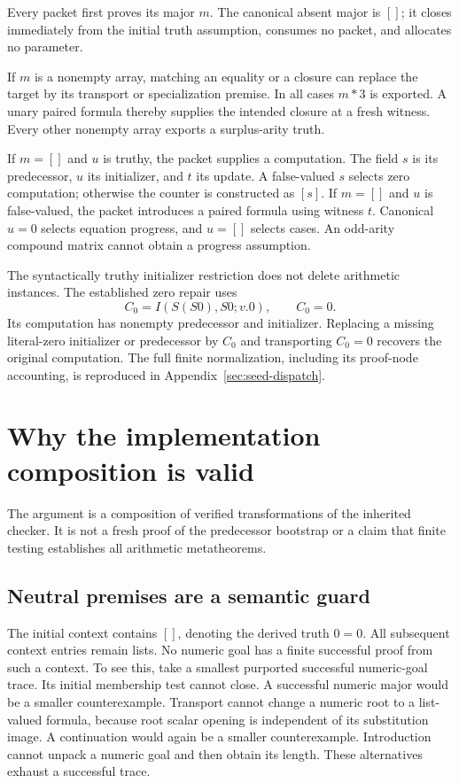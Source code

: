 \documentclass[11pt,letterpaper]{article}
\theoremstyle{definition}\newtheorem{definition}[theorem]{Definition}
\theoremstyle{remark}\newtheorem{remark}[theorem]{Remark}
\begin{document}
Every packet first proves its major $m$. The canonical absent major is $[]$;
it closes immediately from the initial truth assumption, consumes no packet,
and allocates no parameter.

If $m$ is a nonempty array, matching an equality or a closure can replace
the target by its transport or specialization premise. In all cases $m*3$
is exported. A unary paired formula thereby supplies the intended closure
at a fresh witness. Every other nonempty array exports a surplus-arity truth.

If $m=[]$ and $u$ is truthy, the packet supplies a computation. The field $s$
is its predecessor, $u$ its initializer, and $t$ its update. A false-valued $s$
selects zero computation; otherwise the counter is constructed as $[s]$.
If $m=[]$ and $u$ is false-valued, the packet introduces a paired formula
using witness $t$. Canonical $u=0$ selects equation progress, and $u=[]$
selects cases. An odd-arity compound matrix cannot obtain a progress assumption.

The syntactically truthy initializer restriction does not delete arithmetic
instances. The established zero repair uses
\[
       C_0=I(S(S0),S0;v.0),\qquad C_0=0.
\]
Its computation has nonempty predecessor and initializer. Replacing a missing
literal-zero initializer or predecessor by $C_0$ and transporting $C_0=0$
recovers the original computation. The full finite normalization, including
its proof-node accounting, is reproduced in Appendix~\ref{sec:seed-dispatch}.

\section{Why the implementation composition is valid}
\label{sec:composition}

The argument is a composition of verified transformations of the inherited
checker. It is not a fresh proof of the predecessor bootstrap or a claim that
finite testing establishes all arithmetic metatheorems.

\subsection{Neutral premises are a semantic guard}

The initial context contains $[]$, denoting the derived truth $0=0$.
All subsequent context entries remain lists. No numeric goal has a finite
successful proof from such a context. To see this, take a smallest purported
successful numeric-goal trace. Its initial membership test cannot close.
A successful numeric major would be a smaller counterexample. Transport
cannot change a numeric root to a list-valued formula, because root scalar
opening is independent of its substitution image. A continuation would again
be a smaller counterexample. Introduction cannot unpack a numeric goal and
then obtain its length. These alternatives exhaust a successful trace.
\end{document}
